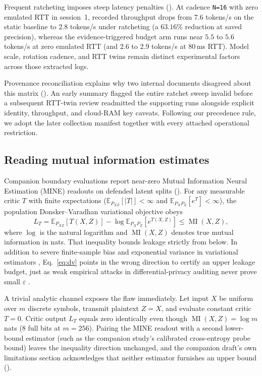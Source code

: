Frequent ratcheting imposes steep latency penalties (). At
cadence \texttt{N=16} with zero emulated RTT in session~1, recorded
throughput drops from $7.6$ tokens/s on the static baseline to $2.8$
tokens/s under ratcheting (a $63.16\%$ reduction at saved precision),
whereas the evidence-triggered budget arm runs near $5.5$ to $5.6$ tokens/s
at zero emulated RTT (and $2.6$ to $2.9$ tokens/s at 80\,ms RTT). Model
scale, rotation cadence, and RTT twins remain distinct experimental factors
across those extracted logs.

Provenance reconciliation explains why two internal documents disagreed
about this matrix (). An early summary flagged the entire
ratchet sweep invalid before a subsequent RTT-twin review readmitted the
supporting runs alongside explicit identity, throughput, and cloud-RAM key
caveats. Following our precedence rule, we adopt the later collection
manifest together with every attached operational restriction.

\subsection{Reading mutual information estimates}

Companion boundary evaluations report near-zero Mutual Information Neural
Estimation (MINE) \cite{belghazi2018} readouts on defended latent splits
(). For any measurable critic $T$ with finite expectations
($\mathbb E_{P_{XZ}}[|T|]<\infty$ and $\mathbb E_{P_XP_Z}[e^{T}]<\infty$),
the population Donsker--Varadhan variational objective obeys
\begin{equation}
 L_T=\mathbb E_{P_{XZ}}[T(X,Z)]-
 \log\mathbb E_{P_XP_Z}[e^{T(X,Z)}]\le \operatorname{MI}(X,Z),
 \label{eq:dv}
\end{equation}
where $\log$ is the natural logarithm and $\operatorname{MI}(X,Z)$ denotes
true mutual information in nats. That inequality bounds leakage strictly
from below. In addition to severe finite-sample bias and exponential
variance in variational estimators \cite{mcallester2020,song2020},
Eq.~\eqref{eq:dv} points in the wrong direction to certify an upper leakage
budget, just as weak empirical attacks in differential-privacy auditing
never prove small $\varepsilon$ \cite{jagielski2020}.

A trivial analytic channel exposes the flaw immediately. Let input $X$ be
uniform over $m$ discrete symbols, transmit plaintext $Z=X$, and evaluate
constant critic $T=0$. Critic output $L_T$ equals zero identically even
though $\operatorname{MI}(X,Z)=\log m$ nats ($8$ full bits at $m=256$).
Pairing the MINE readout with a second lower-bound estimator (such as the
companion study's calibrated cross-entropy probe bound) leaves the
inequality direction unchanged, and the companion draft's own limitations
section acknowledges that neither estimator furnishes an upper bound
().

